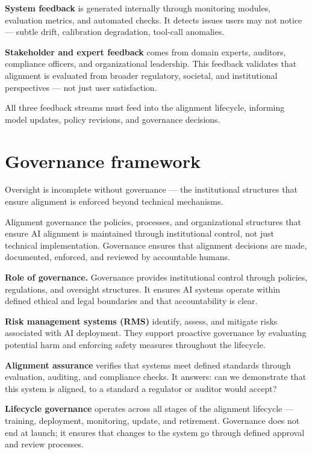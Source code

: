 \textbf{System feedback} is generated internally through monitoring modules, evaluation metrics, and automated checks. It detects issues users may not notice --- subtle drift, calibration degradation, tool-call anomalies.

\textbf{Stakeholder and expert feedback} comes from domain experts, auditors, compliance officers, and organizational leadership. This feedback validates that alignment is evaluated from broader regulatory, societal, and institutional perspectives --- not just user satisfaction.

All three feedback streams must feed into the alignment lifecycle, informing model updates, policy revisions, and governance decisions.

\section{Governance framework}

Oversight is incomplete without governance --- the institutional structures that ensure alignment is enforced beyond technical mechanisms.

\begin{TNdefinition}{Alignment governance} the policies, processes, and organizational structures that ensure AI alignment is maintained through institutional control, not just technical implementation. Governance ensures that alignment decisions are made, documented, enforced, and reviewed by accountable humans. \end{TNdefinition}

\textbf{Role of governance.} Governance provides institutional control through policies, regulations, and oversight structures. It ensures AI systems operate within defined ethical and legal boundaries and that accountability is clear.

\textbf{Risk management systems (RMS)} identify, assess, and mitigate risks associated with AI deployment. They support proactive governance by evaluating potential harm and enforcing safety measures throughout the lifecycle.

\textbf{Alignment assurance} verifies that systems meet defined standards through evaluation, auditing, and compliance checks. It answers: can we demonstrate that this system is aligned, to a standard a regulator or auditor would accept?

\textbf{Lifecycle governance} operates across all stages of the alignment lifecycle --- training, deployment, monitoring, update, and retirement. Governance does not end at launch; it ensures that changes to the system go through defined approval and review processes.

